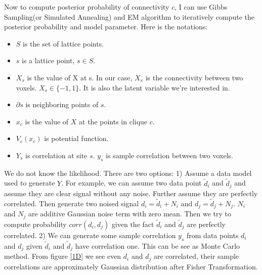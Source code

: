 \documentclass[12pt]{article}
\begin{document}
Now to compute posterior probability of connectivity $c$, I can use Gibbs Sampling(or Simulated Annealing) and EM algorithm to iteratively compute the posterior probability and model parameter. Here is the notations:
\begin{itemize}
\item $S$ is the set of lattice points.
\item $s$ is a lattice point, $s \in S $.
\item $X_s$ is the value of X at s. In our case, $X_s$ is the connectivity between two voxels. $X_s \in \{-1, 1\}$. It is also the latent variable we're interested in.
\item $\partial s$ is neighboring points of $s$.
\item $x_c$ is the value of $X$ at the points in clique $c$.
\item $V_c(x_c)$ is potential function.
\item $Y_s$ is correlation at site $s$. $y_s$ is sample correlation between two voxels. 
\end{itemize}

We do not know the likelihood. There are two options: 1) Assume a data model used to generate $Y$. For example, we can assume two data point $\tilde d_i$ and $\tilde d_j$ and assume they are clear signal without any noise. Further assume they are perfectly correlated. Then generate two noised signal $d_i = \tilde d_i + N_i$ and $d_j = \tilde d_j + N_j$. $N_i$ and $N_j$ are additive Gaussian noise term with zero mean. Then we try to compute probability $corr(d_i, d_j)$ given the fact $\tilde d_i$ and $\tilde d_j$ are perfectly correlated. 2) We can generate some sample correlation $y_s$ from data points $d_i$ and $d_j$ given $\tilde d_i$ and $\tilde d_j$ have correlation one. This can be see as Monte Carlo method. From figure \ref{1D} we see even $d_i$ and $d_j$ are correlated, their sample correlations are approximately Gaussian distribution after Fisher Transformation.
\end{document}
